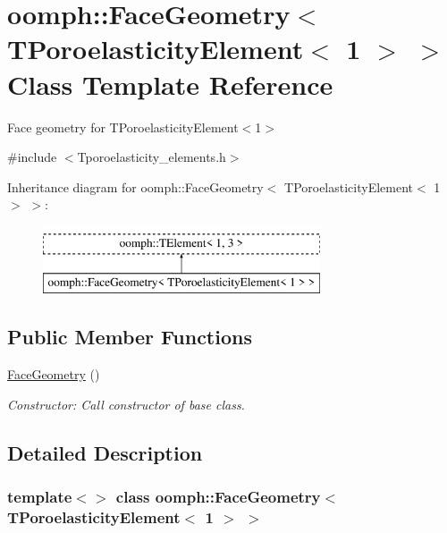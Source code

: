 \hypertarget{classoomph_1_1FaceGeometry_3_01TPoroelasticityElement_3_011_01_4_01_4}{}\section{oomph\+:\+:Face\+Geometry$<$ T\+Poroelasticity\+Element$<$ 1 $>$ $>$ Class Template Reference}
\label{classoomph_1_1FaceGeometry_3_01TPoroelasticityElement_3_011_01_4_01_4}


Face geometry for T\+Poroelasticity\+Element$<$1$>$  




{\ttfamily \#include $<$Tporoelasticity\+\_\+elements.\+h$>$}

Inheritance diagram for oomph\+:\+:Face\+Geometry$<$ T\+Poroelasticity\+Element$<$ 1 $>$ $>$\+:\begin{figure}[H]
\begin{center}
\leavevmode
\includegraphics[height=2.000000cm]{classoomph_1_1FaceGeometry_3_01TPoroelasticityElement_3_011_01_4_01_4}
\end{center}
\end{figure}
\subsection*{Public Member Functions}
\begin{DoxyCompactItemize}
\item 
\hyperlink{classoomph_1_1FaceGeometry_3_01TPoroelasticityElement_3_011_01_4_01_4_a0049267eb05c3e57d1143eac557cd746}{Face\+Geometry} ()
\begin{DoxyCompactList}\small\item\em Constructor\+: Call constructor of base class. \end{DoxyCompactList}\end{DoxyCompactItemize}


\subsection{Detailed Description}
\subsubsection*{template$<$$>$\newline
class oomph\+::\+Face\+Geometry$<$ T\+Poroelasticity\+Element$<$ 1 $>$ $>$}

